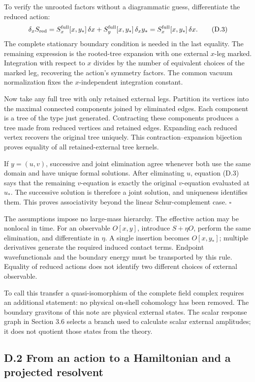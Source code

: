 \documentclass[a4paper,11pt]{article}
\numberwithin{equation}{section}
\begin{document}
To verify the unrooted factors without a diagrammatic guess, differentiate the reduced action: \[
\delta_x S_{\rm red}
=S_x^{\rm full}[x,y_*]\,\delta x
+S_y^{\rm full}[x,y_*]\,\delta_xy_*
=S_x^{\rm full}[x,y_*]\,\delta x.
\tag{D.3}
\] The complete stationary boundary condition is needed in the last equality. The remaining expression is the rooted-tree expansion with one external \(x\)-leg marked. Integration with respect to \(x\) divides by the number of equivalent choices of the marked leg, recovering the action's symmetry factors. The common vacuum normalization fixes the \(x\)-independent integration constant.

Now take any full tree with only retained external legs. Partition its vertices into the maximal connected components joined by eliminated edges. Each component is a tree of the type just generated. Contracting these components produces a tree made from reduced vertices and retained edges. Expanding each reduced vertex recovers the original tree uniquely. This contraction--expansion bijection proves equality of all retained-external tree kernels.

If \(y=(u,v)\), successive and joint elimination agree whenever both use the same domain and have unique formal solutions. After eliminating \(u\), equation (D.3) says that the remaining \(v\)-equation is exactly the original \(v\)-equation evaluated at \(u_*\). The successive solution is therefore a joint solution, and uniqueness identifies them. This proves associativity beyond the linear Schur-complement case. \(\square\)

The assumptions impose no large-mass hierarchy. The effective action may be nonlocal in time. For an observable \(O[x,y]\), introduce \(S+\eta O\), perform the same elimination, and differentiate in \(\eta\). A single insertion becomes \(O[x,y_*]\); multiple derivatives generate the required induced contact terms. Endpoint wavefunctionals and the boundary energy must be transported by this rule. Equality of reduced actions does not identify two different choices of external observable.

To call this transfer a quasi-isomorphism of the complete field complex requires an additional statement: no physical on-shell cohomology has been removed. The boundary gravitons of this note are physical external states. The scalar response graph in Section 3.6 selects a branch used to calculate scalar external amplitudes; it does not quotient those states from the theory.

\hypertarget{d.2-from-an-action-to-a-hamiltonian-and-a-projected-resolvent}{%
\subsection{D.2 From an action to a Hamiltonian and a projected resolvent}\label{d.2-from-an-action-to-a-hamiltonian-and-a-projected-resolvent}}
\end{document}
